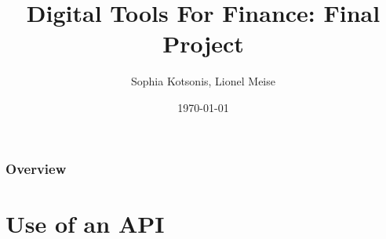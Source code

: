 \documentclass{beamer}
\title[DTFF Project]{Digital Tools For Finance: Final Project} %
\author{Sophia Kotsonis, Lionel Meise} %
\institute[UZH] %
{
University of Zurich \\ %
\medskip
\textit{sophia.kotsonis@uzh.ch, lionel.meise@uzh.ch} %
}
\date{\today} %
\begin{document}
\begin{frame}
\titlepage %
\end{frame}

\begin{frame}
\frametitle{Overview} %
\tableofcontents %
\end{frame}


\section{Use of an API} %

\end{document}
